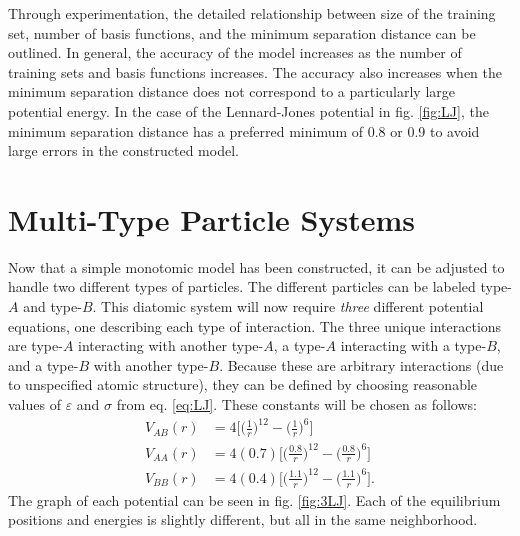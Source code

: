 \par Through experimentation, the detailed relationship between size of the training set, number of basis functions, and the minimum separation distance can be outlined. In general, the accuracy of the model increases as the number of training sets and basis functions increases. The accuracy also increases when the minimum separation distance does not correspond to a particularly large potential energy. In the case of the Lennard-Jones potential in fig. \ref{fig:LJ}, the minimum separation distance has a preferred minimum of 0.8 or 0.9 to avoid large errors in the constructed model.



\section{Multi-Type Particle Systems}\label{Sect:diatomic}
\par Now that a simple monotomic model has been constructed, it can be adjusted to handle two different types of particles. The different particles can be labeled type-$A$ and type-$B$. This diatomic system will now require \textit{three} different potential equations, one describing each type of interaction. The three unique interactions are type-$A$ interacting with another type-$A$, a type-$A$ interacting with a type-$B$, and a type-$B$ with another type-$B$. Because these are arbitrary interactions (due to unspecified atomic structure), they can be defined by choosing reasonable values of $\varepsilon$ and $\sigma$ from eq. \ref{eq:LJ}. These constants will be chosen as follows:
\begin{align}
V_{AB}(r) &= 4 \bigg[\Big(\frac{1}{r}\Big)^{12} - \Big(\frac{1}{r}\Big)^6\bigg] \label{LJ} \\
V_{AA}(r) &= 4 (0.7) \bigg[\Big(\frac{0.8}{r}\Big)^{12} - \Big(\frac{0.8}{r}\Big)^6\bigg] \label{LJ} \\
V_{BB}(r) &= 4 (0.4) \bigg[\Big(\frac{1.1}{r}\Big)^{12} - \Big(\frac{1.1}{r}\Big)^6\bigg] \label{LJ}.
\end{align}
The graph of each potential can be seen in fig. \ref{fig:3LJ}. Each of the equilibrium positions and energies is slightly different, but all in the same neighborhood.

